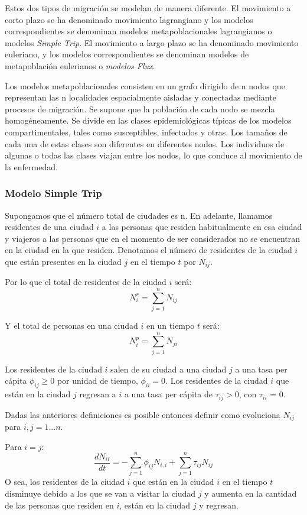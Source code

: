 \documentclass[a4paper,10pt,twocolumn]{article}
\begin{document}
Estos dos tipos de migraci\'on se modelan de manera diferente. El movimiento a corto plazo se ha denominado movimiento lagrangiano y los modelos correspondientes se denominan modelos metapoblacionales lagrangianos o modelos \textit{Simple Trip}. El movimiento a largo plazo se ha denominado movimiento euleriano, y los modelos correspondientes se denominan modelos de metapoblación eulerianos o \textit{modelos Flux}.

Los modelos metapoblacionales consisten en un grafo dirigido de n nodos que representan las n localidades espacialmente aisladas y conectadas mediante procesos de migraci\'on. Se supone que la población de cada nodo se mezcla homogéneamente. Se divide en las clases epidemiológicas típicas de los modelos compartimentales, tales como susceptibles, infectados y otras. Los tamaños de cada una de estas clases son diferentes en diferentes nodos. Los individuos de algunas o todas las clases viajan entre los nodos, lo que conduce al movimiento de la enfermedad.

\subsubsection*{Modelo Simple Trip}
Supongamos que el número total de ciudades es n. En adelante, llamamos residentes de una ciudad $i$ a las personas que residen habitualmente en esa ciudad y viajeros a las personas que en el momento de ser considerados no se encuentran en la ciudad en la que residen. Denotamos el número de residentes de la ciudad $i$ que están presentes en la ciudad $j$ en el tiempo $t$ por $N_{ij}$.

Por lo que el total de residentes de la ciudad $i$ ser\'a:
$$
	N_i^r = \sum_{j=1}^{n} N_{ij}
$$

Y el total de personas en una ciudad $i$ en un tiempo $t$ ser\'a:
$$
	N_i^p = \sum_{j=1}^{n} N_{ji}
$$

Los residentes de la ciudad $i$ salen de su ciudad a una ciudad $j$ a una tasa per cápita $\phi_{ij} \ge 0$ por unidad de tiempo, $\phi_{ii} = 0$. Los residentes de la ciudad $i$ que están en la ciudad $j$ regresan a $i$ a una tasa per cápita de $\tau_{ij} > 0$, con $\tau_{ii}$ = 0.

Dadas las anteriores definiciones es posible entonces definir como evoluciona $N_{ij} $ para $i,j = 1...n$.

Para $i = j$:
$$
	\frac{dN_{ii}}{dt} = -\sum_{j=1}^{n}\phi_{ij}N_{i,i} + \sum_{j=1}^{n}\tau_{ij}N_{ij}
$$
O sea, los residentes de la ciudad $i$ que est\'an en la ciudad $i$ en el tiempo $t$ disminuye debido a los que se van a visitar la ciudad $j$ y aumenta en la cantidad de las personas que residen en $i$, est\'an en la ciudad $j$ y regresan.
\end{document}
